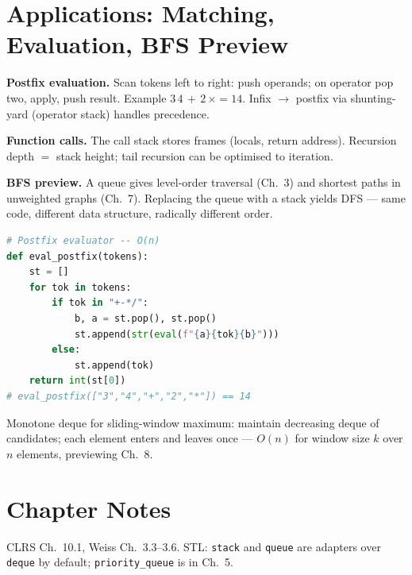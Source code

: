 
\section{Applications: Matching, Evaluation, BFS Preview}
\label{sec:applications-sq}
\textbf{Postfix evaluation.} Scan tokens left to right: push operands; on operator pop two, apply, push result. Example $3\,4\,+\,2\,\times = 14$. Infix $\to$ postfix via shunting-yard (operator stack) handles precedence.

\textbf{Function calls.} The call stack stores frames (locals, return address). Recursion depth $=$ stack height; tail recursion can be optimised to iteration.

\textbf{BFS preview.} A queue gives level-order traversal (Ch.~3) and shortest paths in unweighted graphs (Ch.~7). Replacing the queue with a stack yields DFS --- same code, different data structure, radically different order.

\begin{lstlisting}[language=Python]
# Postfix evaluator -- O(n)
def eval_postfix(tokens):
    st = []
    for tok in tokens:
        if tok in "+-*/":
            b, a = st.pop(), st.pop()
            st.append(str(eval(f"{a}{tok}{b}")))
        else:
            st.append(tok)
    return int(st[0])
# eval_postfix(["3","4","+","2","*"]) == 14
\end{lstlisting}

\begin{remark}
Monotone deque for sliding-window maximum: maintain decreasing deque of candidates; each element enters and leaves once --- $O(n)$ for window size $k$ over $n$ elements, previewing Ch.~8.
\end{remark}

\section{Chapter Notes}
CLRS Ch.~10.1, Weiss Ch.~3.3--3.6. STL: \texttt{stack} and \texttt{queue} are adapters over \texttt{deque} by default; \texttt{priority\_queue} is in Ch.~5.

